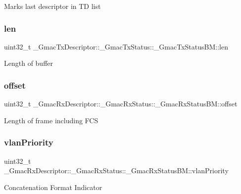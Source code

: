 Marks last descriptor in TD list \mbox{\label{group__gmac__defines_ga6f063648185454976ccc09200fc406b3}} 
\subsubsection{\texorpdfstring{len}{len}}
{\footnotesize\ttfamily uint32\+\_\+t \+\_\+\+Gmac\+Tx\+Descriptor\+::\+\_\+\+Gmac\+Tx\+Status\+::\+\_\+\+Gmac\+Tx\+Status\+B\+M\+::len}

Length of buffer \mbox{\label{group__gmac__defines_gab38a4fb2bdc30d8e44568cbe573cc6ca}} 
\subsubsection{\texorpdfstring{offset}{offset}}
{\footnotesize\ttfamily uint32\+\_\+t \+\_\+\+Gmac\+Rx\+Descriptor\+::\+\_\+\+Gmac\+Rx\+Status\+::\+\_\+\+Gmac\+Rx\+Status\+B\+M\+::offset}

Length of frame including F\+CS \mbox{\label{group__gmac__defines_ga95d12d896b178ea460ee0350114d04f4}} 
\subsubsection{\texorpdfstring{vlanPriority}{vlanPriority}}
{\footnotesize\ttfamily uint32\+\_\+t \+\_\+\+Gmac\+Rx\+Descriptor\+::\+\_\+\+Gmac\+Rx\+Status\+::\+\_\+\+Gmac\+Rx\+Status\+B\+M\+::vlan\+Priority}

Concatenation Format Indicator 